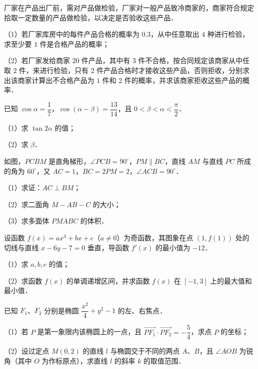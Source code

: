 \begin{question}
厂家在产品出厂前，需对产品做检验，厂家对一般产品致冷商家的，商家符合规定拾取一定数量的产品做检验，以决定是否验收这些产品．

（1）若厂家库房中的每件产品合格的概率为 $0.3$，从中任意取出 $4$ 种进行检验，求至少要 $1$ 件是合格产品的概率；

（2）若厂家发给商家 $20$ 件产品，其中有 $3$ 件不合格，按合同规定该商家从中任取 $2$ 件，来进行检验，只有 $2$ 件产品合格时才接收这些产品，否则拒收，分别求出该商家计算出不合格产品为 $1$ 件和 $2$ 件的概率，并求该商家拒收这些产品的概率．

\end{question}
\begin{question}
已知 $\cos\alpha=\dfrac17$，$\cos(\alpha-\beta)=\dfrac{13}{14}$，且 $0<\beta<\alpha<\dfrac{\pi}{2}$．

（1）求 $\tan2\alpha$ 的值；

（2）求 $\beta$．

\Needspace{0.4\textheight}
\end{question}
\begin{question}
如图，$PCBM$ 是直角梯形，$\angle PCB=90^\circ$，$PM\parallel BC$，直线 $AM$ 与直线 $PC$ 所成的角为 $60^\circ$，又 $AC=1$，$BC=2PM=2$，$\angle ACB=90^\circ$．
\nopagebreak[4]
\begin{center}\end{center}
\nopagebreak[4]
（1）求证：$AC\perp BM$；

（2）求二面角 $M-AB-C$ 的大小；

（3）求多面体 $PMABC$ 的体积．

\end{question}
\begin{question}
设函数 $f(x)=ax^3+bx+c$（$a\neq0$）为奇函数，其图象在点 $(1,f(1))$ 处的切线与直线 $x-6y-7=0$ 垂直，导函数 $f'(x)$ 的最小值为 $-12$．

（1）求 $a,b,c$ 的值；

（2）求函数 $f(x)$ 的单调递增区间，并求函数 $f(x)$ 在 $[-1,3]$ 上的最大值和最小值．

\end{question}
\begin{question}
已知 $F_1$、$F_2$ 分别是椭圆 $\dfrac{x^2}{4}+y^2-1$ 的左、右焦点．

（1）若 $P$ 是第一象限内该椭圆上的一点，且 $\overrightarrow{PF_1}\cdot\overrightarrow{PF_2}=-\dfrac54$，求点 $P$ 的坐标；

（2）设过定点 $M(0,2)$ 的直线 $l$ 与椭圆交于不同的两点 $A$、$B$，且 $\angle AOB$ 为锐角（其中 $O$ 为作标原点），求直线 $l$ 的斜率 $k$ 的取值范围．

\end{question}
